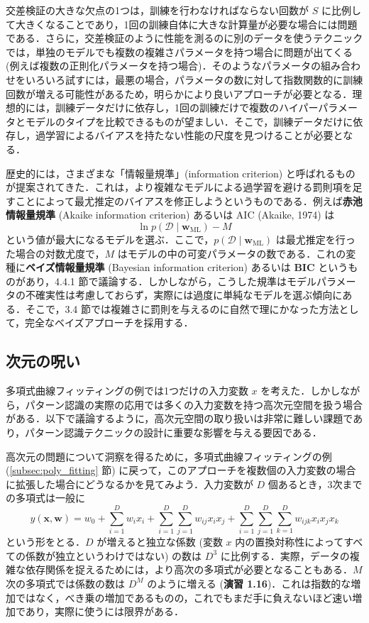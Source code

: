 \documentclass[uplatex,a4paper,oneside,openany,dvipdfmx]{jsarticle}
\numberwithin{equation}{section}
\theoremstyle{mystyle} %
\newcommand{\CD}{\mathcal{D}}
\newcommand{\tb}[1]{\textbf{#1}}
\newcommand{\bs}[1]{\boldsymbol{#1}}
\begin{document}
交差検証の大きな欠点の1つは，訓練を行わなければならない回数が $S$ に比例して大きくなることであり，1回の訓練自体に大きな計算量が必要な場合には問題である．さらに，交差検証のように性能を測るのに別のデータを使うテクニックでは，単独のモデルでも複数の複雑さパラメータを持つ場合に問題が出てくる (例えば複数の正則化パラメータを持つ場合)．そのようなパラメータの組み合わせをいろいろ試すには，最悪の場合，パラメータの数に対して指数関数的に訓練回数が増える可能性があるため，明らかにより良いアプローチが必要となる．理想的には，訓練データだけに依存し，1回の訓練だけで複数のハイパーパラメータとモデルのタイプを比較できるものが望ましい．そこで，訓練データだけに依存し，過学習によるバイアスを持たない性能の尺度を見つけることが必要となる．

歴史的には，さまざまな「情報量規準」(information criterion) と呼ばれるものが提案されてきた．これは，より複雑なモデルによる過学習を避ける罰則項を足すことによって最尤推定のバイアスを修正しようというものである．例えば\tb{赤池情報量規準} (Akaike information criterion) あるいは AIC (Akaike, 1974) は
\begin{equation} \label{eq:1.73}
    \ln p(\CD \mid \bs{w}_{\text{ML}}) - M
\end{equation}
という値が最大になるモデルを選ぶ．ここで，$p(\CD \mid \bs{w}_{\text{ML}})$ は最尤推定を行った場合の対数尤度で，$M$ はモデルの中の可変パラメータの数である．これの変種に\tb{ベイズ情報量規準} (Bayesian information criterion) あるいは \tb{BIC} というものがあり，4.4.1 節で議論する．しかしながら，こうした規準はモデルパラメータの不確実性は考慮しておらず，実際には過度に単純なモデルを選ぶ傾向にある．そこで，3.4 節では複雑さに罰則を与えるのに自然で理にかなった方法として，完全なベイズアプローチを採用する．

\subsection{次元の呪い} \label{subsec:the_curse_of_dimensionality}

多項式曲線フィッティングの例では1つだけの入力変数 $x$ を考えた．しかしながら，パターン認識の実際の応用では多くの入力変数を持つ高次元空間を扱う場合がある．以下で議論するように，高次元空間の取り扱いは非常に難しい課題であり，パターン認識テクニックの設計に重要な影響を与える要因である．

高次元の問題について洞察を得るために，多項式曲線フィッティングの例 (\ref{subsec:poly_fitting} 節) に戻って，このアプローチを複数個の入力変数の場合に拡張した場合にどうなるかを見てみよう．入力変数が $D$ 個あるとき，3次までの多項式は一般に
\begin{equation} \label{eq:1.74}
    y(\bs{x}, \bs{w}) = w_{0} + \sum_{i=1}^{D} w_{i}x_{i} + \sum_{i=1}^{D} \sum_{j=1}^{D} w_{ij}x_{i}x_{j} + \sum_{i=1}^{D} \sum_{j=1}^{D} \sum_{k=1}^{D} w_{ijk}x_{i}x_{j}x_{k}
\end{equation}
という形をとる．$D$ が増えると独立な係数 (変数 $x$ 内の置換対称性によってすべての係数が独立というわけではない) の数は $D^{3}$ に比例する．実際，データの複雑な依存関係を捉えるためには，より高次の多項式が必要となることもある．$M$ 次の多項式では係数の数は $D^{M}$ のように増える (\tb{演習 1.16})．これは指数的な増加ではなく，べき乗の増加であるものの，これでもまだ手に負えないほど速い増加であり，実際に使うには限界がある．
\end{document}
